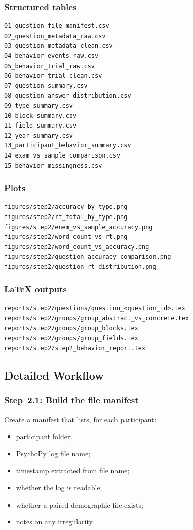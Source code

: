 \documentclass[11pt]{article}
\begin{document}
\subsubsection*{Structured tables}
\begin{verbatim}
01_question_file_manifest.csv
02_question_metadata_raw.csv
03_question_metadata_clean.csv
04_behavior_events_raw.csv
05_behavior_trial_raw.csv
06_behavior_trial_clean.csv
07_question_summary.csv
08_question_answer_distribution.csv
09_type_summary.csv
10_block_summary.csv
11_field_summary.csv
12_year_summary.csv
13_participant_behavior_summary.csv
14_exam_vs_sample_comparison.csv
15_behavior_missingness.csv
\end{verbatim}

\subsubsection*{Plots}
\begin{verbatim}
figures/step2/accuracy_by_type.png
figures/step2/rt_total_by_type.png
figures/step2/enem_vs_sample_accuracy.png
figures/step2/word_count_vs_rt.png
figures/step2/word_count_vs_accuracy.png
figures/step2/question_accuracy_comparison.png
figures/step2/question_rt_distribution.png
\end{verbatim}

\subsubsection*{\LaTeX{} outputs}
\begin{verbatim}
reports/step2/questions/question_<question_id>.tex
reports/step2/groups/group_abstract_vs_concrete.tex
reports/step2/groups/group_blocks.tex
reports/step2/groups/group_fields.tex
reports/step2/step2_behavior_report.tex
\end{verbatim}

\subsection{Detailed Workflow}

\subsubsection{Step~2.1: Build the file manifest}
Create a manifest that lists, for each participant:
\begin{itemize}
    \item participant folder;
    \item PsychoPy log file name;
    \item timestamp extracted from file name;
    \item whether the log is readable;
    \item whether a paired demographic file exists;
    \item notes on any irregularity.
\end{itemize}
\end{document}
